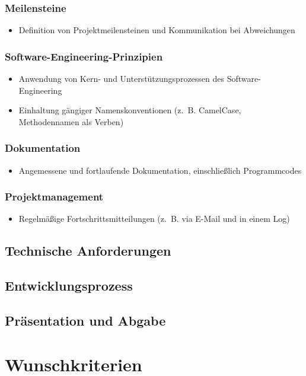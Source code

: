 \documentclass[%
	ngerman,
	12pt,
	a4paper
]{scrbook}
\begin{document}
		\subsubsection{Meilensteine}
		\begin{itemize}
			\item Definition von Projektmeilensteinen und Kommunikation bei Abweichungen
		\end{itemize}
		\subsubsection{Software-Engineering-Prinzipien}
		\begin{itemize}
			\item Anwendung von Kern- und Unterstützungsprozessen des Software-Engineering
			\item Einhaltung gängiger Namenskonventionen (z.~B. CamelCase, Methodennamen als Verben)
		\end{itemize}
		\subsubsection{Dokumentation}
		\begin{itemize}
			\item Angemessene und fortlaufende Dokumentation, einschließlich Programmcodes
		\end{itemize}
		\subsubsection{Projektmanagement}
		\begin{itemize}
			\item Regelmäßige Fortschrittsmitteilungen (z.~B. via E-Mail und in einem Log)
		\end{itemize}

\subsection{Technische Anforderungen}
\subsection{Entwicklungsprozess}
\subsection{Präsentation und Abgabe}

\section{Wunschkriterien}
\end{document}
